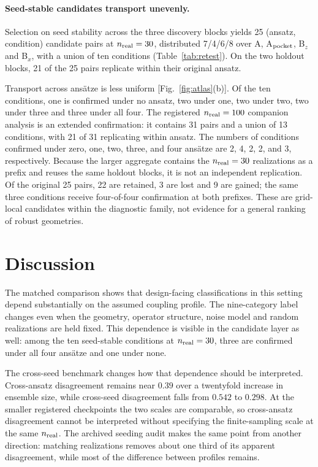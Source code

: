 \documentclass[aip,jap,reprint,superscriptaddress,longbibliography,floatfix]{revtex4-2}
\begin{document}
\paragraph{Seed-stable candidates transport unevenly.}
Selection on seed stability across the three discovery blocks yields 25
(ansatz, condition) candidate pairs at $n_{\rm real}=30$, distributed 7/4/6/8
over A, A$_{\rm pocket}$, B$_z$ and B$_x$, with a union of ten conditions
(Table~\ref{tab:retest}). On the two holdout blocks, 21 of the 25 pairs
replicate within their original ansatz.

Transport across ans\"atze is less uniform [Fig.~\ref{fig:atlas}(b)]. Of the ten
conditions, one is confirmed under no ansatz, two under one, two under two, two
under three and three under all four. The registered $n_{\rm real}=100$
companion analysis is an extended confirmation: it contains 31 pairs and a
union of 13 conditions, with 21 of 31 replicating within ansatz. The numbers of
conditions confirmed under zero, one, two, three, and four ans\"atze are 2, 4,
2, 2, and 3, respectively. Because the larger
aggregate contains the $n_{\rm real}=30$ realizations as a prefix and reuses
the same holdout blocks, it is not an independent replication. Of the original
25 pairs, 22 are retained, 3 are lost and 9 are gained; the same three
conditions receive four-of-four confirmation at both prefixes. These are
grid-local candidates within the diagnostic family, not evidence for a general
ranking of robust geometries.


\section{Discussion}

The matched comparison shows that design-facing classifications in this setting
depend substantially on the assumed coupling profile. The nine-category label
changes even when the geometry, operator structure, noise model and random
realizations are held fixed. This dependence is visible in the candidate layer
as well: among the ten seed-stable conditions at $n_{\rm real}=30$, three are
confirmed under all four ans\"atze and one under none.

The cross-seed benchmark changes how that dependence should be interpreted.
Cross-ansatz disagreement remains near $0.39$ over a twentyfold increase in
ensemble size, while cross-seed disagreement falls from $0.542$ to $0.298$.
At the smaller registered checkpoints the two scales are comparable, so
cross-ansatz disagreement cannot be interpreted without specifying the
finite-sampling scale at the same $n_{\rm real}$. The archived seeding audit
makes the same point from another direction: matching realizations removes
about one third of its apparent disagreement, while most of the difference
between profiles remains.
\end{document}
